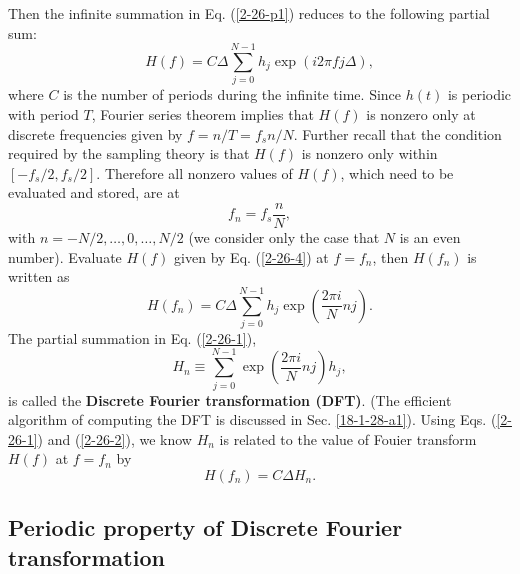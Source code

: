 \documentclass{article}
\newcommand{\tmstrong}[1]{\textbf{#1}}
\begin{document}
Then the infinite summation in Eq. (\ref{2-26-p1}) reduces to the following
partial sum:
\begin{equation}
  \label{2-26-4} H (f) = C \Delta \sum_{j = 0}^{N - 1} h_j \exp (i 2 \pi f j
  \Delta),
\end{equation}
where $C$ is the number of periods during the infinite time. Since $h (t)$ is
periodic with period $T$, Fourier series theorem implies that $H (f)$ is
nonzero only at discrete frequencies given by $f = n / T = f_s n / N$. Further
recall that the condition required by the sampling theory is that $H (f)$ is
nonzero only within $[- f_s / 2, f_s / 2]$. Therefore all nonzero values of $H
(f)$, which need to be evaluated and stored, are at
\begin{equation}
  \label{10-26-1} f_n = f_s \frac{n}{N},
\end{equation}
with $n = - N / 2, \ldots, 0, \ldots, N / 2$ (we consider only the case that
$N$ is an even number). Evaluate $H (f)$ given by Eq. (\ref{2-26-4}) at $f =
f_n$, then $H (f_n)$ is written as
\begin{equation}
  \label{2-26-1} H (f_n) = C \Delta \sum_{j = 0}^{N - 1} h_j \exp \left(
  \frac{2 \pi i}{N} n j \right) .
\end{equation}
The partial summation in Eq. (\ref{2-26-1}),
\begin{equation}
  \label{2-26-2} H_n \equiv \sum_{j = 0}^{N - 1} \exp \left( \frac{2 \pi i}{N}
  n j \right) h_j,
\end{equation}
is called the {\tmstrong{Discrete Fourier transformation (DFT)}}. (The
efficient algorithm of computing the DFT is discussed in Sec.
\ref{18-1-28-a1}). Using Eqs. (\ref{2-26-1}) and (\ref{2-26-2}), we know $H_n$
is related to the value of Fouier transform $H (f)$ at $f = f_n$ by
\begin{equation}
  H (f_n) = C \Delta H_n .
\end{equation}

\subsection{Periodic property of Discrete Fourier transformation}
\end{document}
